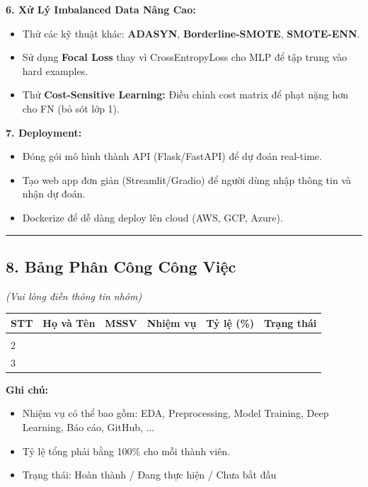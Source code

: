 \documentclass[
]{article}
\newcounter{none} %
\providecommand{\tightlist}{%
  \setlength{\itemsep}{0pt}\setlength{\parskip}{0pt}}
\begin{document}
\textbf{6. Xử Lý Imbalanced Data Nâng Cao:}

\begin{itemize}
\tightlist
\item
  Thử các kỹ thuật khác: \textbf{ADASYN}, \textbf{Borderline-SMOTE},
  \textbf{SMOTE-ENN}.
\item
  Sử dụng \textbf{Focal Loss} thay vì CrossEntropyLoss cho MLP để tập
  trung vào hard examples.
\item
  Thử \textbf{Cost-Sensitive Learning:} Điều chỉnh cost matrix để phạt
  nặng hơn cho FN (bỏ sót lớp 1).
\end{itemize}

\textbf{7. Deployment:}

\begin{itemize}
\tightlist
\item
  Đóng gói mô hình thành API (Flask/FastAPI) để dự đoán real-time.
\item
  Tạo web app đơn giản (Streamlit/Gradio) để người dùng nhập thông tin
  và nhận dự đoán.
\item
  Dockerize để dễ dàng deploy lên cloud (AWS, GCP, Azure).
\end{itemize}

\begin{center}\rule{0.5\linewidth}{0.5pt}\end{center}

\subsection{8. Bảng Phân Công Công
Việc}\label{8-bux1ea3ng-phuxe2n-cuxf4ng-cuxf4ng-viux1ec7c}

\emph{(Vui lòng điền thông tin nhóm)}

{\def\LTcaptype{none} %
\begin{longtable}[]{@{}llllll@{}}
\toprule\noalign{}
STT & Họ và Tên & MSSV & Nhiệm vụ & Tỷ lệ (\%) & Trạng thái \\
\midrule\noalign{}
\endhead
\bottomrule\noalign{}
\endlastfoot
1 & & & & & \\
2 & & & & & \\
3 & & & & & \\
\end{longtable}
}

\textbf{Ghi chú:}

\begin{itemize}
\tightlist
\item
  Nhiệm vụ có thể bao gồm: EDA, Preprocessing, Model Training, Deep
  Learning, Báo cáo, GitHub, ...
\item
  Tỷ lệ tổng phải bằng 100\% cho mỗi thành viên.
\item
  Trạng thái: Hoàn thành / Đang thực hiện / Chưa bắt đầu
\end{itemize}
\end{document}
